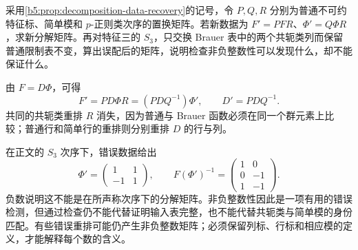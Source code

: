 \begin{optionalexercise}\label{b5:ex:08-character-data-permutation}
	采用\cref{b5:prop:decomposition-data-recovery}的记号，令 \(P,Q,R\) 分别为普通不可约特征标、简单模和 \(p\)-正则类次序的置换矩阵。若新数据为 \(F'=PFR\)、\(\Phi'=Q\Phi R\)，求新分解矩阵。再对特征三的 \(S_3\)，只交换 Brauer 表中的两个共轭类列而保留普通限制表不变，算出误配后的矩阵，说明检查非负整数性可以发现什么，却不能保证什么。
\end{optionalexercise}
\begin{solution}
	由 \(F=D\Phi\)，可得
	\[
		F'=PD\Phi R=(PDQ^{-1})\Phi',\qquad D'=PDQ^{-1}.
	\]
	共同的共轭类重排 \(R\) 消失，因为普通与 Brauer 函数必须在同一个群元素上比较；普通行和简单行的重排则分别重排 \(D\) 的行与列。

	在正文的 \(S_3\) 次序下，错误数据给出
	\[
		\Phi'=\begin{pmatrix}1&1\\-1&1\end{pmatrix},\qquad
		F(\Phi')^{-1}=\begin{pmatrix}1&0\\0&-1\\1&-1\end{pmatrix}.
	\]
	负数说明这不能是在所声称次序下的分解矩阵。非负整数性因此是一项有用的错误检测，但通过检查仍不能代替证明输入表完整，也不能代替共轭类与简单模的身份匹配。有些错误重排可能仍产生非负整数矩阵；必须保留列标、行标和相应模的定义，才能解释每个数的含义。
\end{solution}
